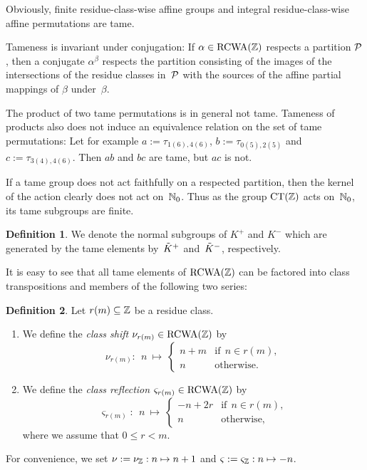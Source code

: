 \documentclass{amsart}
\theoremstyle{definition} \newtheorem{CTZDefinition}{Definition}[section]
\theoremstyle{plain}      \newtheorem{CTZPropertiesTheorem}[CTZDefinition]{Theorem}
\theoremstyle{plain}      \newtheorem{CTZSubgroupsTheorem}[CTZDefinition]{Theorem}
\theoremstyle{definition} \newtheorem{RcwaMappingDefinition}{Definition}[section]
\theoremstyle{definition} \newtheorem{RCWADefinition}[RcwaMappingDefinition]{Definition}
\theoremstyle{plain}      \newtheorem{CTZNotFinitelyGeneratedTheorem}
\theoremstyle{definition} \newtheorem{CTZSmEmbeddingDefinition}[RcwaMappingDefinition]{Definition}
\theoremstyle{plain}      \newtheorem{CTZHighlyTransitiveTheorem}[RcwaMappingDefinition]{Theorem}
\theoremstyle{plain}      \newtheorem{CTZTorsionElementsDivisibleTheorem}
\theoremstyle{plain}      \newtheorem{CTLemma}{Lemma}[section]
\theoremstyle{plain}      \newtheorem{IntegralCommutatorLemma}[CTLemma]{Lemma}
\theoremstyle{plain}      \newtheorem{NormalSubgroupContainsIntegralElementLemma}[CTLemma]{Lemma}
\theoremstyle{plain}      \newtheorem{CTZSimpleTheorem}[CTLemma]{Theorem}
\theoremstyle{remark}     \newtheorem{CTZSimpleRemark}[CTLemma]{Remark}
\theoremstyle{definition} \newtheorem{CTPZDefinition}[CTLemma]{Definition}
\theoremstyle{plain}      \newtheorem{CTPZSimpleCorollary}[CTLemma]{Corollary}
\theoremstyle{plain}      \newtheorem{CTPZSimpleProblem}[CTLemma]{Problem}
\theoremstyle{plain}      \newtheorem{FnPSL2ZEmbeddingTheorem}{Theorem}[section]
\theoremstyle{plain}      \newtheorem{FreeProductEmbeddingTheorem}[FnPSL2ZEmbeddingTheorem]{Theorem}
\theoremstyle{definition} \newtheorem{RestrictionMonomorphismDefinition}
\theoremstyle{plain}      \newtheorem{DirectAndWreathProductsEmbeddingTheorem}
\theoremstyle{plain}      \newtheorem{DirectAndWreathProductsEmbeddingCorollary}
\theoremstyle{definition} \newtheorem{CTintZDefinition}[FnPSL2ZEmbeddingTheorem]{Definition}
\theoremstyle{plain}      \newtheorem{CTintZSimpleTheorem}[FnPSL2ZEmbeddingTheorem]{Theorem}
\theoremstyle{definition} \newtheorem{KernelDefinition}{Definition}[section]
\theoremstyle{definition} \newtheorem{TameWildDefinition}[KernelDefinition]{Definition}
\theoremstyle{definition} \newtheorem{SimpleSupergroupsDefinition}[KernelDefinition]{Definition}
\theoremstyle{definition} \newtheorem{CSCRDefinition}[KernelDefinition]{Definition}
\theoremstyle{plain}      \newtheorem{SimpleSupergroupsGeneratorsTheorem}[KernelDefinition]{Theorem}
\theoremstyle{plain}      \newtheorem{SimpleSupergroupsTheorem}[KernelDefinition]{Theorem}
\theoremstyle{plain}      \newtheorem{SimpleSupergroupsTransitivityTheorem}
\theoremstyle{plain}      \newtheorem{TameGenerationConjecture}[KernelDefinition]{Conjecture}
\theoremstyle{remark}     \newtheorem{TameGenerationRemark}[KernelDefinition]{Remark}
\begin{document}
Obviously, finite residue-class-wise affine groups and integral residue-class-wise
affine permutations are tame.

Tameness is invariant under conjugation: If \(\alpha \in \RCWA{\ZZ}\) respects a partition
\(\mathcal{P}\), then a conjugate \(\alpha^\beta\) respects the partition consisting of the images of
the intersections of the residue classes in~\(\mathcal{P}\) with the sources of the affine partial
mappings of \(\beta\) under~\(\beta\).

The product of two tame permutations is in general not tame.
Tameness of products also does not induce an equivalence relation on the set of tame
permutations: Let for example \(a := \tau_{1(6),4(6)}\), \(b := \tau_{0(5),2(5)}\) and
\(c := \tau_{3(4),4(6)}\). Then \(ab\) and \(bc\) are tame, but \(ac\) is not.

If a tame group does not act faithfully on a respected partition, then the kernel of the action
clearly does not act on~\(\mathbb{N}_0\). Thus as the group \(\CT{\ZZ}\) acts on~\(\mathbb{N}_0\), its tame
subgroups are finite.

\begin{SimpleSupergroupsDefinition} \label{SimpleSupergroupsDefinition}
  We denote the normal subgroups of \(K^+\) and \(K^-\) which are generated by the tame elements
  by~\(\tilde{K}^+\) and~\(\tilde{K}^-\), respectively.
\end{SimpleSupergroupsDefinition}

\goodbreak

It is easy to see that all tame elements of \(\RCWA{\ZZ}\) can be factored into
class transpositions and members of the following two series:

\begin{CSCRDefinition} \label{CSCRDefinition}
  Let \(r(m) \subseteq \mathbb{Z}\) be a residue class.
  \begin{enumerate}

    \item We define the \emph{class shift} \(\nu_{r(m)} \in \RCWA{\ZZ}\) by
          \[
            \nu_{r(m)}: \ \ n \ \mapsto \
            \begin{cases}
              n + m & \text{if} \ \ n \in r(m), \\
              n     & \text{otherwise}.
            \end{cases}
          \]

    \item We define the \emph{class reflection} \(\varsigma_{r(m)} \in \RCWA{\ZZ}\) by
          \[
            \varsigma_{r(m)}: \ \ n \ \mapsto \
            \begin{cases}
              -n + 2r & \text{if} \ \ n \in r(m), \\
              n       & \text{otherwise},
            \end{cases}
          \]
          where we assume that \(0 \leq r < m\).

  \end{enumerate}
  For convenience, we set \(\nu := \nu_{\mathbb{Z}}: n \mapsto n + 1\)
  and \(\varsigma := \varsigma_{\mathbb{Z}}: n \mapsto -n\).
\end{CSCRDefinition}
\end{document}
